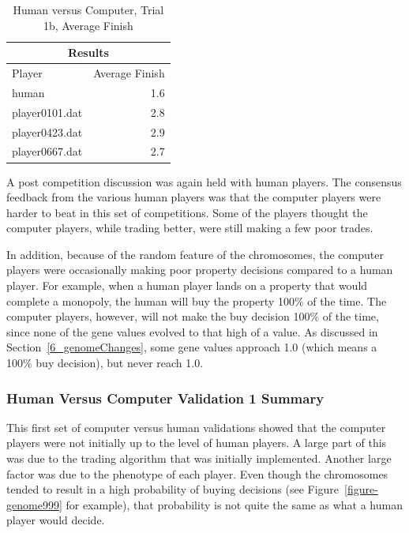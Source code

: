 \begin{table}[htbp]
  \centering
  \caption{Human versus Computer, Trial 1b, Average Finish}
    \begin{tabular}{lr}
    \toprule
    \multicolumn{2}{c}{Results} \\
    \midrule
    Player & Average Finish \\
    \multicolumn{1}{l}{human} & 1.6 \\
    \multicolumn{1}{l}{player0101.dat} & 2.8 \\
    \multicolumn{1}{l}{player0423.dat} & 2.9 \\
    \multicolumn{1}{l}{player0667.dat} & 2.7 \\
    \bottomrule
    \end{tabular}%
  \label{tab:human_results1d}%
\end{table}%

A post competition discussion was again held with human players. The consensus
feedback from the various human players was that the computer players were
harder to beat in this set of competitions. Some of the players thought the
computer players, while trading better, were still making a few poor trades.

In addition, because of the random feature of the chromosomes, the computer
players were occasionally making poor property decisions compared to a human
player. For example, when a human player lands on a property that would complete
a monopoly, the human will buy the property 100\% of the time. The computer
players, however, will not make the buy decision 100\% of the time, since none
of the gene values evolved to that high of a value. As discussed in
Section~\ref{6_genomeChanges}, some gene values approach 1.0 (which means a
100\% buy decision), but never reach 1.0.

\subsubsection{Human Versus Computer Validation 1 Summary}

This first set of computer versus human validations showed that the computer
players were not initially up to the level of human players. A large part of
this was due to the trading algorithm that was initially implemented. Another
large factor was due to the phenotype of each player. Even though the
chromosomes tended to result in a high probability of buying decisions (see
Figure~\ref{figure-genome999} for example), that probability is not quite the
same as what a human player would decide. 

